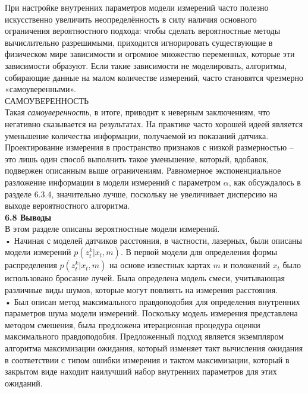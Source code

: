 \documentclass[10pt,a4paper]{article}
\begin{document}
При настройке внутренних параметров модели измерений часто полезно искусственно увеличить неопределённость в силу наличия основного ограничения вероятностного подхода: чтобы сделать вероятностные методы вычислительно разрешимыми, приходится игнорировать существующие в физическом мире зависимости и огромное множество переменных, которые эти зависимости образуют. Если такие зависимости не моделировать, алгоритмы, собирающие данные на малом количестве измерений, часто становятся чрезмерно «самоуверенными».\\
САМОУВЕРЕННОСТЬ\\ Такая
\textit{самоуверенность}, в итоге, приводит к неверным заключениям, что негативно сказывается на результатах. На практике часто хорошей идеей является уменьшение количества информации, получаемой из показаний датчика. Проектирование измерения в пространство признаков с низкой размерностью – это лишь один способ выполнить такое уменьшение, который, вдобавок, подвержен описанным выше ограничениям. Равномерное экспоненциальное разложение информации в модели измерений с параметром $\alpha$, как обсуждалось в разделе 6.3.4, значительно лучше, поскольку не увеличивает дисперсию на выходе вероятностного алгоритма.\\

\textbf{6.8 Выводы}\\

В этом разделе описаны вероятностные модели измерений.\\

• Начиная с моделей датчиков расстояния, в частности, лазерных, были описаны модели измерений $p(z_t^k | x_t, m)$. В первой модели для определения формы распределения $p(z_t^k | x_t, m)$ на основе известных картах $m$ и положений  $x_t$ было использовано бросание лучей. Была определена модель смеси, учитывающая различные виды шумов, которые могут повлиять на измерения расстояния.\\ 

• Был описан метод максимального правдоподобия для определения внутренних параметров шума модели измерений. Поскольку модель измерения представлена методом смешения, была предложена итерационная процедура оценки максимального правдоподобия. Предложенный подход является экземпляром алгоритма максимизации ожидания, который изменяет такт вычисления ожидания в соответствии с типом ошибки измерения и тактом максимизации, который в закрытом виде находит наилучший набор внутренних параметров для этих ожиданий. \\
\end{document}
